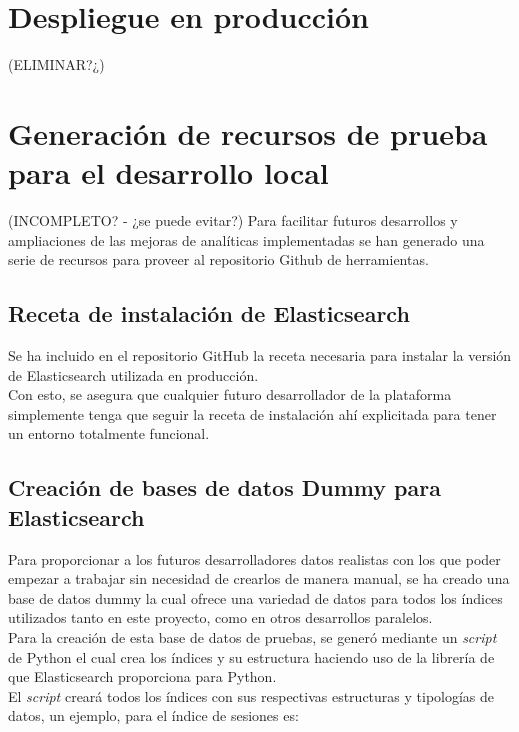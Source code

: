 \documentclass[11pt,a4paper]{book}
\begin{document}
		\section{Despliegue en producción}
			(ELIMINAR?¿)
		\section{Generación de recursos de prueba para el desarrollo local}
			(INCOMPLETO? - ¿se puede evitar?)
			Para facilitar futuros desarrollos y ampliaciones de las mejoras de analíticas implementadas se han generado una serie de recursos para proveer al repositorio Github de herramientas.
			\subsection{Receta de instalación de Elasticsearch}
				Se ha incluido en el repositorio GitHub la receta necesaria para instalar la versión de Elasticsearch utilizada en producción.\\
				
				Con esto, se asegura que cualquier futuro desarrollador de la plataforma simplemente tenga que seguir la receta de instalación ahí explicitada para tener un entorno totalmente funcional.\\
				
			\subsection{Creación de bases de datos Dummy para Elasticsearch}
				Para proporcionar a los futuros desarrolladores datos realistas con los que poder empezar a trabajar sin necesidad de crearlos de manera manual, se ha creado una base de datos dummy la cual ofrece una variedad de datos para todos los índices utilizados tanto en este proyecto, como en otros desarrollos paralelos.\\
				
				Para la creación de esta base de datos de pruebas, se generó mediante un \textit{script} de Python el cual crea los índices y su estructura haciendo uso de la librería de que Elasticsearch proporciona para Python.\\
				
				El \textit{script} creará todos los índices con sus respectivas estructuras y tipologías de datos, un ejemplo, para el índice de sesiones es:
				
\end{document}
